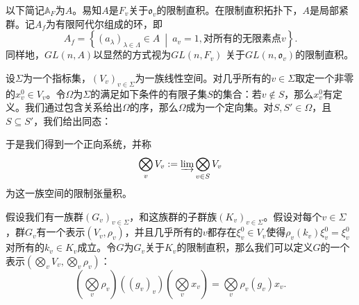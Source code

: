 以下简记$\mathbb{A}_F$为$A$。易知$A$是$F_v$关于$\mathfrak{o}_v$的限制直积。在限制直积拓扑下，$A$是局部紧群。记$A_f$为有限阿代尔组成的环，即
$$
A_f = \left\{ (a_\lambda)_{\lambda\in\Lambda} \in A \ \middle|\ a_v = 1, \text{对所有的无限素点}v \right\}.
$$
同样地，$GL(n, A)$以显然的方式视为$GL(n, F_v)$ 关于$GL(n, \mathfrak{o}_v)$的限制直积。

\begin{definition}
设$\Sigma$为一个指标集，$(V_v)_{v\in\Sigma}$为一族线性空间。对几乎所有的$v\in\Sigma$取定一个非零的$x_v^0 \in V_v$。令$\Omega$为$\Sigma$的满足如下条件的有限子集$S$的集合：若$v\not\in S$，那么$x_v^0$有定义。我们通过包含关系给出$\Omega$的序，那么$\Omega$成为一个定向集。对$S, S'\in\Omega$，且$S \subseteq S'$，我们给出同态：
\begin{figure}[H]
\centering
{}
\end{figure}
于是我们得到一个正向系统，并称
$$
\bigotimes\limits_v V_v := \varinjlim \bigotimes\limits_{v\in S} V_v
$$
为这一族空间的限制张量积。
\end{definition}

假设我们有一族群$(G_v)_{v\in\Sigma}$，和这族群的子群族$(K_v)_{v\in\Sigma}$。假设对每个$v\in\Sigma$，群$G_v$有一个表示$(V_v,\rho_v)$，并且几乎所有的$v$都存在$\xi_v^0\in V_v$使得$\rho_v(k_v)\xi_v^0 = \xi_v^0$对所有的$k_v \in K_v$成立。令$G$为$G_v$关于$K_v$的限制直积，那么我们可以定义$G$的一个表示$\displaystyle \left( \bigotimes\limits_{v}V_v,  \bigotimes\limits_{v}\rho_v \right)$：
$$
\left(\bigotimes\limits_{v}\rho_v\right) \left( (g_v)_v \right) \left(\bigotimes\limits_{v}x_v\right) = \bigotimes\limits_{v} \rho_v(g_v)x_v.
$$

